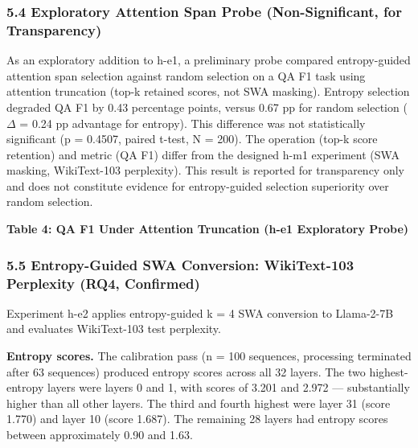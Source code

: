 \subsubsection{5.4 Exploratory Attention Span Probe (Non-Significant, for Transparency)}

As an exploratory addition to h-e1, a preliminary probe compared entropy-guided attention span selection against random selection on a QA F1 task using attention truncation (top-k retained scores, not SWA masking). Entropy selection degraded QA F1 by 0.43 percentage points, versus 0.67 pp for random selection ($\Delta$ = 0.24 pp advantage for entropy). This difference was not statistically significant (p = 0.4507, paired t-test, N = 200). The operation (top-k score retention) and metric (QA F1) differ from the designed h-m1 experiment (SWA masking, WikiText-103 perplexity). This result is reported for transparency only and does not constitute evidence for entropy-guided selection superiority over random selection.

\textbf{Table 4: QA F1 Under Attention Truncation (h-e1 Exploratory Probe)}

\begin{table}[htbp]
\centering
{}
\end{table}

\subsubsection{5.5 Entropy-Guided SWA Conversion: WikiText-103 Perplexity (RQ4, Confirmed)}

Experiment h-e2 applies entropy-guided k = 4 SWA conversion to Llama-2-7B and evaluates WikiText-103 test perplexity.

\textbf{Entropy scores.} The calibration pass (n = 100 sequences, processing terminated after 63 sequences) produced entropy scores across all 32 layers. The two highest-entropy layers were layers 0 and 1, with scores of 3.201 and 2.972 --- substantially higher than all other layers. The third and fourth highest were layer 31 (score 1.770) and layer 10 (score 1.687). The remaining 28 layers had entropy scores between approximately 0.90 and 1.63.

